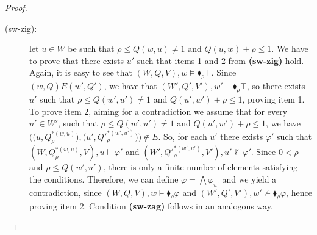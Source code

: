 \begin{proof}
\begin{description}
    \item[(sw-zig):] let $u \in W$ be such that $\rho \leq Q(w,u) \neq 1 $ and $Q(u,w) + \rho \leq 1$. We have to prove that there exists $u'$ such that items 1 and 2 from \textbf{(sw-zig)} hold. Again, it is easy to see that $(W,{Q},V) , w \models \blacklozenge_{\rho} \top $. Since $(w,{Q})E(w',{Q}')$, we have that $(W',{Q}',V') , w' \models \blacklozenge_{\rho} \top $, so there exists $u'$ such that $\rho \leq Q(w',u') \neq 1 $ and $Q(u',w') + \rho \leq 1$, proving item 1. To prove item 2, aiming for a contradiction we assume that for every $u' \in W'$, such that $\rho \leq Q(w',u') \neq 1$ and $Q(u',w') + \rho \leq 1$, we have $\big ( \big ( u, {Q}_{\rho}^{*(w,u)} \big ), \big ( u',{Q}'^{*(w',u')}_{\rho}\big )\big ) \notin E$. So, for each $u'$ there exists $\varphi'$ such that $(W,{Q}^{*(w,u)}_{\rho},V) , u \models \varphi'$ and $(W',{Q}'^{*(w',u')}_{\rho},V') , u' \not \models \varphi'$. Since $0 < \rho$  and $\rho \leq Q(w', u')$, there is only a finite number of elements satisfying the conditions. Therefore, we can define $\varphi = \bigwedge \varphi_{u'}$ and we yield a contradiction, since $(W,{Q},V) , w \models \blacklozenge_\rho \varphi$ and $(W',{Q}',V') , w' \not \models \blacklozenge_\rho \varphi$, hence proving item 2. Condition \textbf{(sw-zag)} follows in an analogous way. \qedhere

\end{description}
\end{proof}

